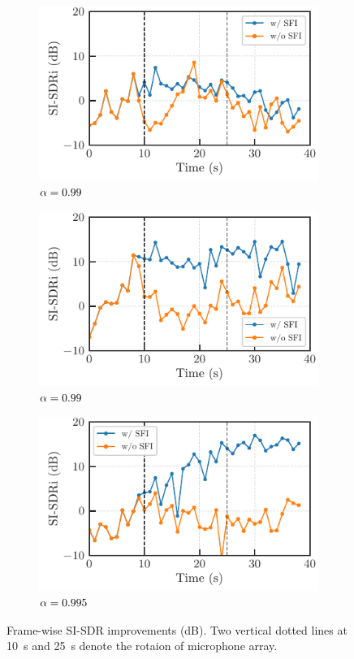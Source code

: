 \documentclass[twocolumn,9pt,dvipdfmx]{article}
\begin{document}
\begin{figure}[t]
  \centering
  \begin{subfigure}[t]{\linewidth}
    \includegraphics{figures/plots/online/Gauss_8000_97.pdf}
    \caption{$\alpha = 0.99$}
  \end{subfigure}
  \begin{subfigure}[t]{\linewidth}
    \includegraphics{figures/plots/online/Gauss_8000_99.pdf}
    \caption{$\alpha = 0.99$}
  \end{subfigure}
  \begin{subfigure}[t]{\linewidth}
    \includegraphics{figures/plots/online/Gauss_8000_995.pdf}
    \caption{$\alpha = 0.995$}
  \end{subfigure}
  \caption{Frame-wise SI-SDR improvements (dB). Two vertical dotted lines at \SI{10}{\second} and \SI{25}{\second} denote the rotaion of microphone array.}
  \label{fig:online}
\end{figure}
\end{document}
